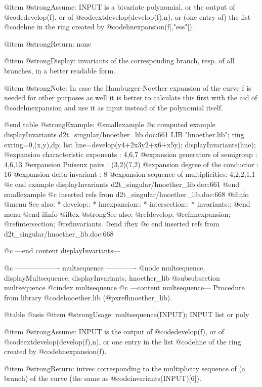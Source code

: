 @item @strong{Assume:}
INPUT is a bivariate polynomial, or the output of @code{develop(f)}, or of
@code{extdevelop(develop(f),n)}, or (one entry of) the list @code{hne}
in the ring created by @code{hnexpansion(f[,"ess"])}.

@item @strong{Return:}
none

@item @strong{Display:}
invariants of the corresponding branch, resp. of all branches,
in a better readable form.

@item @strong{Note:}
In case the Hamburger-Noether expansion of the curve f is needed
for other purposes as well it is better to calculate this first
with the aid of @code{hnexpansion} and use it as input instead of
the polynomial itself.

@end table
@strong{Example:}
@smallexample
@c computed example displayInvariants d2t_singular/hnoether_lib.doc:661 
LIB "hnoether.lib";
ring exring=0,(x,y),dp;
list hne=develop(y4+2x3y2+x6+x5y);
displayInvariants(hne);
@expansion{}  characteristic exponents  : 4,6,7
@expansion{}  generators of semigroup   : 4,6,13
@expansion{}  Puiseux pairs             : (3,2)(7,2)
@expansion{}  degree of the conductor   : 16
@expansion{}  delta invariant           : 8
@expansion{}  sequence of multiplicities: 4,2,2,1,1
@c end example displayInvariants d2t_singular/hnoether_lib.doc:661
@end smallexample
@c inserted refs from d2t_singular/hnoether_lib.doc:668
@ifinfo
@menu
See also:
* develop::
* hnexpansion::
* intersection::
* invariants::
@end menu
@end ifinfo
@iftex
@strong{See also:}
@ref{develop};
@ref{hnexpansion};
@ref{intersection};
@ref{invariants}.
@end iftex
@c end inserted refs from d2t_singular/hnoether_lib.doc:668

@c ---end content displayInvariants---

@c ------------------- multsequence -------------
@node multsequence, displayMultsequence, displayInvariants, hnoether_lib
@subsubsection multsequence
@cindex multsequence
@c ---content multsequence---
Procedure from library @code{hnoether.lib} (@pxref{hnoether_lib}).

@table @asis
@item @strong{Usage:}
multsequence(INPUT); INPUT list or poly

@item @strong{Assume:}
INPUT is the output of @code{develop(f)}, or of @code{extdevelop(develop(f),n)},
or one entry in the list @code{hne} of the ring created by @code{hnexpansion(f)}.

@item @strong{Return:}
intvec corresponding to the multiplicity sequence of (a branch)
of the curve (the same as @code{invariants(INPUT)[6]}).


